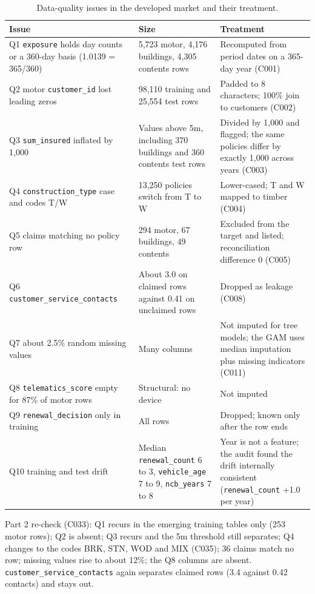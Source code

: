 \documentclass{rapport}
\begin{document}
\begin{table}[h]
\centering
\small
\begin{tabular}{p{4.6cm}p{4.0cm}p{6.0cm}}
\hline
Issue & Size & Treatment\\
\hline
Q1 \texttt{exposure} holds day counts or a 360-day basis (1.0139 = 365/360) & 5,723 motor, 4,176 buildings, 4,305 contents rows & Recomputed from period dates on a 365-day year (C001)\\
Q2 motor \texttt{customer\_id} lost leading zeros & 98,110 training and 25,554 test rows & Padded to 8 characters; 100\% join to customers (C002)\\
Q3 \texttt{sum\_insured} inflated by 1,000 & Values above 5m, including 370 buildings and 360 contents test rows & Divided by 1,000 and flagged; the same policies differ by exactly 1,000 across years (C003)\\
Q4 \texttt{construction\_type} case and codes T/W & 13,250 policies switch from T to W & Lower-cased; T and W mapped to timber (C004)\\
Q5 claims matching no policy row & 294 motor, 67 buildings, 49 contents & Excluded from the target and listed; reconciliation difference 0 (C005)\\
Q6 \texttt{customer\_service\_contacts} & About 3.0 on claimed rows against 0.41 on unclaimed rows & Dropped as leakage (C008)\\
Q7 about 2.5\% random missing values & Many columns & Not imputed for tree models; the GAM uses median imputation plus missing indicators (C011)\\
Q8 \texttt{telematics\_score} empty for 87\% of motor rows & Structural: no device & Not imputed\\
Q9 \texttt{renewal\_decision} only in training & All rows & Dropped; known only after the row ends\\
Q10 training and test drift & Median \texttt{renewal\_count} 6 to 3, \texttt{vehicle\_age} 7 to 9, \texttt{ncb\_years} 7 to 8 & Year is not a feature; the audit found the drift internally consistent (\texttt{renewal\_count} +1.0 per year)\\
\hline
\end{tabular}
\caption{Data-quality issues in the developed market and their treatment.}
\label{ov:tab-dq}
\end{table}

Part 2 re-check (C033): Q1 recurs in the emerging training tables only (253 motor rows); Q2 is absent; Q3 recurs and
the 5m threshold still separates; Q4 changes to the codes BRK, STN, WOD and MIX (C035); 36 claims match no row; missing
values rise to about 12\%; the Q8 columns are absent. \texttt{customer\_service\_contacts} again separates claimed rows
(3.4 against 0.42 contacts) and stays out.
\end{document}
